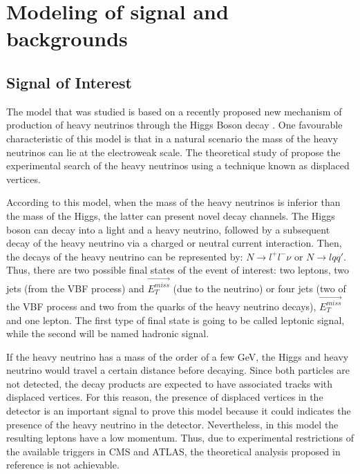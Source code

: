 \chapter{Modeling of signal and backgrounds}
\label{Model_chapter}
 
\section{Signal of Interest}

The model that was studied is based on a recently proposed new mechanism of production of heavy neutrinos through the Higgs Boson decay \cite{Seesaw Mechanism with displaced vertices}. One
favourable characteristic of this model is that in a natural scenario the mass of the heavy neutrinos can lie at the electroweak scale. The theoretical study of \cite{Seesaw Mechanism with displaced vertices}
propose the experimental search of the heavy neutrinos using a technique known as displaced vertices.

According to this model, when the mass of the heavy neutrinos is inferior than the mass of the Higgs, the latter can present novel decay channels. The Higgs boson can decay into a light and a heavy
neutrino, followed by a subsequent decay of the heavy neutrino via a charged or neutral current interaction. Then, the decays of the heavy neutrino can be represented by: $N \rightarrow l^+ l^- \nu$
or $N \rightarrow l q q'$. Thus, there are two possible final states of the event of interest: two leptons, two jets (from the VBF process) and $\vec{E_T^{miss}}$ (due to the neutrino) or four jets 
(two of the VBF process and two from the quarks of the heavy neutrino decays), $\vec{E_T^{miss}}$ and one lepton. The first type of final state is going to be called leptonic signal, while the second
will be named hadronic signal.

If the heavy neutrino has a mass of the order of a few GeV, the Higgs and heavy neutrino would travel a certain distance before decaying. Since both particles are not detected, the decay products 
are expected to have associated tracks with displaced vertices. For this reason, the presence of displaced vertices in the detector is an important signal to prove this model because it could 
indicates the presence of the heavy neutrino in the detector. Nevertheless, in this model the resulting leptons have a low momentum. Thus, due to experimental restrictions of the available triggers
in CMS and ATLAS, the theoretical analysis proposed in reference \cite{Seesaw Mechanism with displaced vertices} is not achievable.  


